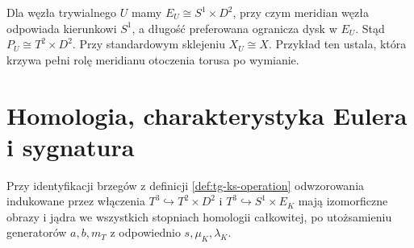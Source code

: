 \begin{center}
\end{center}

\begin{przyklad}
Dla węzła trywialnego $U$ mamy $E_U\cong S^1\times D^2$,
przy czym meridian węzła odpowiada kierunkowi $S^1$,
a długość preferowana ogranicza dysk w $E_U$.
Stąd $P_U\cong T^2\times D^2$. Przy standardowym sklejeniu
$X_U\cong X$. Przykład ten ustala, która krzywa
pełni rolę meridianu otoczenia torusa po wymianie.
\end{przyklad}

\section{Homologia, charakterystyka Eulera i sygnatura}
\label{sec:tg-ks-homology}

\begin{stwierdzenie}
\label{prop:tg-ks-boundary-maps}
Przy identyfikacji brzegów z definicji
\ref{def:tg-ks-operation} odwzorowania indukowane
przez włączenia $T^3\hookrightarrow T^2\times D^2$
i $T^3\hookrightarrow S^1\times E_K$ mają izomorficzne
obrazy i jądra we wszystkich stopniach homologii
całkowitej, po utożsamieniu generatorów $a,b,m_T$
z odpowiednio $s,\mu_K,\lambda_K$.
\end{stwierdzenie}


